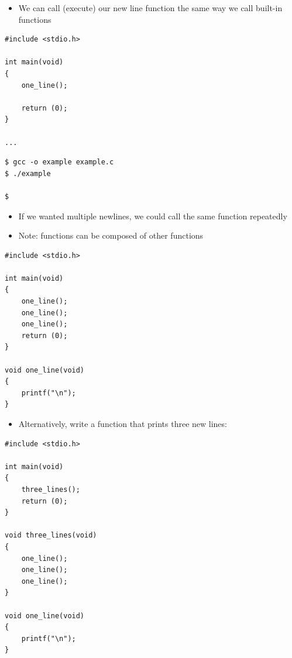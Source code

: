 \documentclass{beamer}
\begin{document}
\begin{frame}[fragile]
\begin{itemize}
\item We can call (execute) our new line function the same way we call built-in functions
\end{itemize}

\begin{block}{}
\begin{lstlisting}
#include <stdio.h>

int main(void) 
{
    one_line();
    
    return (0);
}

...
\end{lstlisting}
\end{block}

\begin{block}{}
\begin{lstlisting}
$ gcc -o example example.c
$ ./example

$

\end{lstlisting}
\end{block}
\end{frame}

\begin{frame}[fragile]
\begin{itemize}
\item If we wanted multiple newlines, we could call the same function repeatedly
\item Note: functions can be composed of other functions
\end{itemize}

\begin{block}{}
\begin{lstlisting}
#include <stdio.h>

int main(void) 
{
    one_line();
    one_line();
    one_line();
    return (0);
}

void one_line(void)
{
    printf("\n");
}
\end{lstlisting}
\end{block}
\end{frame}

\begin{frame}[fragile]
\begin{itemize}
\item Alternatively, write a function that prints three new lines: 
\end{itemize}
\begin{block}{}
\begin{lstlisting}
#include <stdio.h>

int main(void) 
{
    three_lines();
    return (0);
}

void three_lines(void)
{
    one_line();
    one_line();
    one_line();
}

void one_line(void)
{
    printf("\n");
}
\end{lstlisting}
\end{block}
\end{frame}
\end{document}
